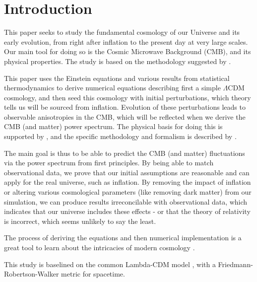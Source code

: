\section{Introduction}

This paper seeks to study the fundamental cosmology of our Universe and its early evolution, from right after inflation to the present day at very large scales. Our main tool for doing so is the Cosmic Microwave Background (CMB), and its physical properties. The study is based on the methodology suggested by \citet{callinHowCalculateCMB2006}.

This paper uses the Einstein equations and various results from statistical thermodynamics to derive numerical equations describing first a simple $\Lambda$CDM cosmology, and then seed this cosmology with initial perturbations, which theory tells us will be sourced from inflation. Evolution of these perturbations leads to observable anisotropies in the CMB, which will be reflected when we derive the CMB (and matter) power spectrum. The physical basis for doing this is supported by \citet{dodelsonModernCosmology2003}, and the specific methodology and formalism is described by \citet{wintherCosmologyIILecture2024}.

The main goal is thus to be able to predict the CMB (and matter) fluctuations via the power spectrum from first principles. By being able to match observational data, we prove that our initial assumptions are reasonable and can apply for the real universe, such as inflation. By removing the impact of inflation or altering various cosmological parameters (like removing dark matter) from our simulation, we can produce results irreconcilable with observational data, which indicates that our universe includes these effects - or that the theory of relativity is incorrect, which seems unlikely to say the least.

The process of deriving the equations and then numerical implementation is a great tool to learn about the intricacies of modern cosmology \citep{callinHowCalculateCMB2006}. 

This study is baselined on the common Lambda-CDM model \citep[chap. 1][sec. 1.6]{dodelsonModernCosmology2021}, with a {Friedmann}-{Robertson}-{Walker} metric for spacetime.
   
